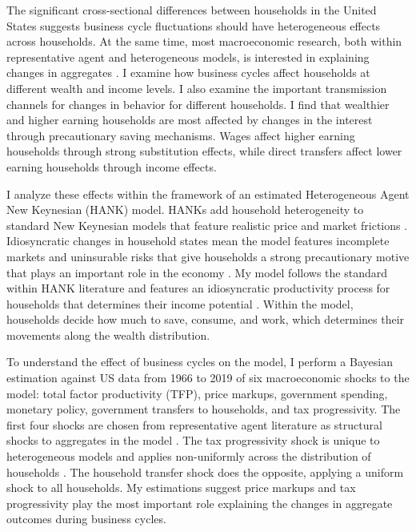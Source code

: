 The significant cross-sectional differences between households in the United States suggests business cycle fluctuations should have heterogeneous effects across households. At the same time, most macroeconomic research, both within representative agent and heterogeneous models, is interested in explaining changes in aggregates \autocites{smets2007shocks}{krusell1998income}{kaplan2018monetary}{auclert2019monetary}{mckay2016power}. I examine how business cycles affect households at different wealth and income levels. I also examine the important transmission channels for changes in behavior for different households. I find that wealthier and higher earning households are most affected by changes in the interest through precautionary saving mechanisms. Wages affect higher earning households through strong substitution effects, while direct transfers affect lower earning households through income effects.

I analyze these effects within the framework of an estimated Heterogeneous Agent New Keynesian (HANK) model. HANKs add household heterogeneity to standard New Keynesian models that feature realistic price and market frictions \autocite{kaplan2018monetary}. Idiosyncratic changes in household states mean the model features incomplete markets and uninsurable risks that give households a strong precautionary motive that plays an important role in the economy \autocites{mckay2016power}{bayer2019precautionary}. My model follows the standard within HANK literature and features an idiosyncratic productivity process for households that determines their income potential \autocites{kaplan2018monetary}{mckay2016power}. Within the model, households decide how much to save, consume, and work, which determines their movements along the wealth distribution.

To understand the effect of business cycles on the model, I perform a Bayesian estimation against US data from 1966 to 2019 of six macroeconomic shocks to the model: total factor productivity (TFP), price markups, government spending, monetary policy, government transfers to households, and tax progressivity. The first four shocks are chosen from representative agent literature as structural shocks to aggregates in the model \autocite{smets2007shocks}. The tax progressivity shock is unique to heterogeneous models and applies non-uniformly across the distribution of households \autocite{bayer2024shocks}. The household transfer shock does the opposite, applying a uniform shock to all households. My estimations suggest price markups and tax progressivity play the most important role explaining the changes in aggregate outcomes during business cycles.

